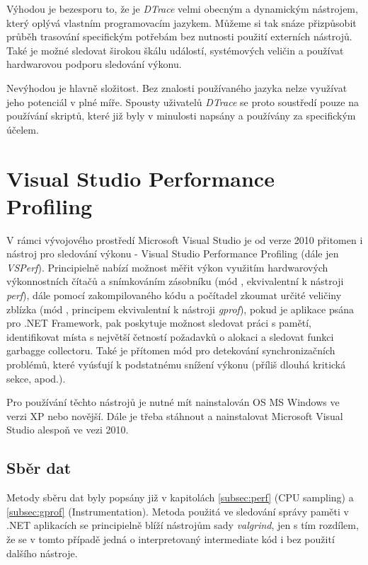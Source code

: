 \documentclass[czech,BP]{thesiskiv}
\begin{document}
Výhodou je bezesporu to, že je \emph{DTrace} velmi obecným a dynamickým nástrojem, který oplývá vlastním programovacím jazykem. Můžeme si tak snáze přizpůsobit průběh trasování specifickým potřebám bez nutnosti použití externích nástrojů. Také je možné sledovat širokou škálu událostí, systémových veličin a používat hardwarovou podporu sledování výkonu.

Nevýhodou je hlavně složitost. Bez znalosti používaného jazyka nelze využívat jeho potenciál v plné míře. Spousty uživatelů \emph{DTrace} se proto soustředí pouze na používání skriptů, které již byly v minulosti napsány a používány za specifickým účelem.




\section{Visual Studio Performance Profiling}

V rámci vývojového prostředí Microsoft Visual Studio je od verze 2010 přitomen i nástroj pro sledování výkonu - Visual Studio Performance Profiling (dále jen \emph{VSPerf})\cite{vsperf}. Principielně nabízí možnost měřit výkon využitím hardwarových výkonnostních čítačů a snímkováním zásobníku (mód , ekvivalentní k nástroji \emph{perf}), dále pomocí zakompilovaného kódu a počítadel zkoumat určité veličiny zblízka (mód , principem ekvivalentní k nástroji \emph{gprof}), pokud je aplikace psána pro .NET Framework, pak poskytuje možnost sledovat práci s pamětí, identifikovat místa s největší četností požadavků o alokaci a sledovat funkci garbagge collectoru. Také je přítomen mód pro detekování synchronizačních problémů, které vyúsťují k podstatnému snížení výkonu (příliš dlouhá kritická sekce, apod.).

Pro používání těchto nástrojů je nutné mít nainstalován OS MS Windows ve verzi XP nebo novější. Dále je třeba stáhnout a nainstalovat Microsoft Visual Studio alespoň ve vezi 2010.

\subsection*{Sběr dat}

Metody sběru dat byly popsány již v kapitolách \ref{subsec:perf} (CPU sampling) a \ref{subsec:gprof} (Instrumentation). Metoda použitá ve sledování správy paměti v .NET aplikacích se principielně blíží nástrojům sady \emph{valgrind}, jen s tím rozdílem, že se v tomto případě jedná o interpretovaný intermediate kód i bez použití dalšího nástroje.
\end{document}
